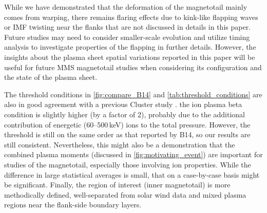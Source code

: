 \documentclass[draft]{agujournal2019}
\begin{document}
While we have demonstrated that the deformation of the magnetotail mainly comes from warping, there remains flaring effects due to kink-like flapping waves or IMF twisting near the flanks that are not discussed in details in this paper. Future studies may need to consider smaller-scale evolution and utilize timing analysis to investigate properties of the flapping in further details. However, the insights about the plasma sheet spatial variations reported in this paper will be useful for future MMS magnetotail studies when considering its configuration and the state of the plasma sheet.

The threshold conditions in \cref{fig:compare_B14} and \cref{tab:threshold_conditions} are also in good agreement with a previous Cluster study \cite{Boakes2014}. the ion plasma beta condition is slightly higher (by a factor of 2), probably due to the additional contribution of energetic (60--500\,\si{keV}) ions to the total pressure. However, the threshold is still on the same order as that reported by B14, so our results are still consistent. Nevertheless, this might also be a demonstration that the combined plasma moments (discussed in \cref{fig:motivating_event}) are important for studies of the magnetotail, especially those involving ion properties. While the difference in large statistical averages is small, that on a case-by-case basis might be significant. Finally, the region of interest (inner magnetotail) is more methodically defined, well-separated from solar wind data and mixed plasma regions near the flank-side boundary layers.
\end{document}
